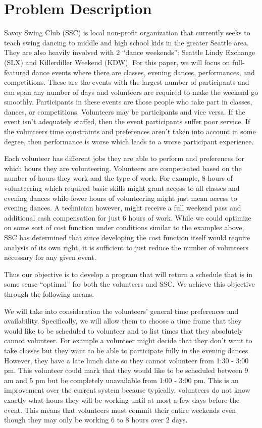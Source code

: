 \documentclass[11pt]{article}
\theoremstyle{definition}
\begin{document}
\section{Problem Description}
\begin{multicols}{2}
Savoy Swing Club (SSC) is local non-profit organization that currently seeks to teach swing dancing to middle and high school kids in the greater Seattle area.
They are also heavily involved with 2 ``dance weekends'': Seattle Lindy Exchange (SLX) and Killerdiller Weekend (KDW). For this paper, we will focus on full-featured dance events where there are classes, evening dances, performances, and competitions.
These are the events with the largest number of participants and can span any number of days and volunteers are required to make the weekend go smoothly.
Participants in these events are those people who take part in classes, dances, or competitions.
Volunteers may be participants and vice versa.
If the event isn't adequately staffed, then the event participants suffer poor service.
If the volunteers time constraints and preferences aren't taken into account in some degree, then performance is worse which leads to a worse participant experience.

Each volunteer has different jobs they are able to perform and preferences for which hours they are volunteering.
Volunteers are compensated based on the number of hours they work and the type of work.
For example, 8 hours of volunteering which required basic skills might grant access to all classes and evening dances while fewer hours of volunteering might just mean access to evening dances.
A technician however, might receive a full weekend pass and additional cash compensation for just 6 hours of work.
While we could optimize on some sort of cost function under conditions similar to the examples above, SSC has determined that since developing the cost function itself would require analysis of its own right, it is sufficient to just reduce the number of volunteers necessary for any given event.

Thus our objective is to develop a program that will return a schedule that is in some sense ``optimal'' for both the volunteers and SSC.
We achieve this objective through the following means.

We will take into consideration the volunteers' general time preferences and availability.
Specifically, we will allow them to choose a time frame that they would like to be scheduled to volunteer and to list times that they absolutely cannot volunteer.
For example a volunteer might decide that they don't want to take classes but they want to be able to participate fully in the evening dances. However, they have a late lunch date so they cannot volunteer from 1:30 - 3:00 pm.
This volunteer could mark that they would like to be scheduled between 9 am and 5 pm but be completely unavailable from 1:00 - 3:00 pm.
This is an improvement over the current system because typically, volunteers do not know exactly what hours they will be working until at most a few days before the event.
This means that volunteers must commit their entire weekends even though they may only be working 6 to 8 hours over 2 days.


\end{multicols}
\end{document}
